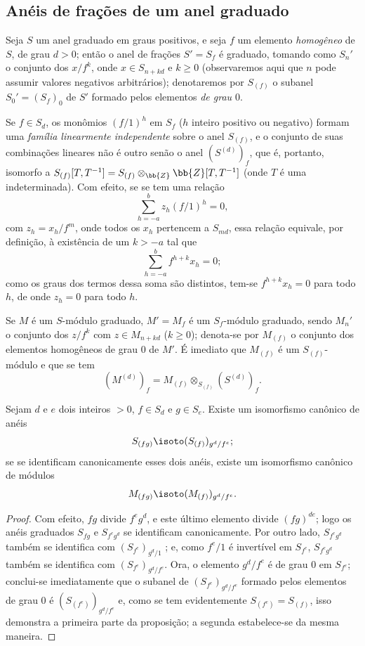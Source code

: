 \documentclass[oneside,10pt]{amsart}
\renewcommand{\geq}{\geqslant}
\newcommand{\oldpage}[2][]{\marginnote{\normalfont\footnotesize\textbf{#1}~|~#2}\ignorespaces}
\let\EGAOriginalLabel\label
\renewcommand{\label}[1]{\phantomsection\EGAOriginalLabel{#1}}
\begin{document}
\subsection{Anéis de frações de um anel graduado}
\label{subsection:II.2.2}

\begin{env}[2.2.1]
\label{II.2.2.1}
Seja $S$ um anel graduado em graus positivos, e seja $f$ um elemento \emph{homogêneo} de $S$, de grau $d>0$; então o anel de frações $S'=S_f$ é graduado, tomando como $S_n'$ o conjunto dos $x/f^k$, onde $x\in S_{n+kd}$ e $k\geq0$ (observaremos aqui que $n$ pode assumir valores negativos arbitrários); denotaremos por $S_{(f)}$ o subanel $S_0'=(S_f)_0$ de $S'$ formado pelos elementos \emph{de grau $0$}.

Se $f\in S_d$, os monômios $(f/1)^h$ em $S_f$ ($h$ inteiro positivo ou negativo) formam uma \emph{família linearmente independente} sobre o anel $S_{(f)}$, e o conjunto de suas combinações lineares não é outro senão
\oldpage[II]{24}
o anel $(S^{(d)})_f$, que é, portanto, isomorfo a $S_{(f)}[T,T^{-1}]=S_{(f)}\otimes_\bb{Z}\bb{Z}[T,T^{-1}]$ (onde $T$ é uma indeterminada).
Com efeito, se se tem uma relação
\[
  \sum_{h=-a}^{b}z_h(f/1)^h=0,
\]
com $z_h=x_h/f^m$, onde todos os $x_h$ pertencem a $S_{md}$, essa relação equivale, por definição, à existência de um $k>-a$ tal que
\[
  \sum_{h=-a}^{b}f^{h+k}x_h=0;
\]
como os graus dos termos dessa soma são distintos, tem-se $f^{h+k}x_h=0$ para todo $h$, de onde $z_h=0$ para todo $h$.

Se $M$ é um $S$-módulo graduado, $M'=M_f$ é um $S_f$-módulo graduado, sendo $M_n'$ o conjunto dos $z/f^k$ com $z\in M_{n+kd}$ ($k\geq0$); denota-se por $M_{(f)}$ o conjunto dos elementos homogêneos de grau $0$ de $M'$.
É imediato que $M_{(f)}$ é um $S_{(f)}$-módulo e que se tem
\[
  (M^{(d)})_f=M_{(f)}\otimes_{S_{(f)}}(S^{(d)})_f.
\]
\end{env}

\begin{lemma}[2.2.2]
\label{II.2.2.2}
Sejam $d$ e $e$ dois inteiros $>0$, $f\in S_d$ e $g\in S_e$.
Existe um isomorfismo canônico de anéis
\[
  S_{(fg)}\isoto(S_{(f)})_{g^d/f^e};
\]
se se identificam canonicamente esses dois anéis, existe um isomorfismo canônico de módulos
\[
  M_{(fg)}\isoto(M_{(f)})_{g^d/f^e}.
\]
\end{lemma}

\begin{proof}
Com efeito, $fg$ divide $f^eg^d$, e este último elemento divide $(fg)^{de}$; logo os anéis graduados $S_{fg}$ e $S_{f^eg^d}$ se identificam canonicamente.
Por outro lado, $S_{f^eg^d}$ também se identifica com $(S_{f^e})_{g^d/1}$ ; e, como $f^e/1$ é invertível em $S_{f^e}$, $S_{f^eg^d}$ também se identifica com $(S_{f^e})_{g^d/f^e}$.
Ora, o elemento $g^d/f^e$ é de grau $0$ em $S_{f^e}$; conclui-se imediatamente que o subanel de $(S_{f^e})_{g^d/f^e}$ formado pelos elementos de grau $0$ é $(S_{(f^e)})_{g^d/f^e}$ e, como se tem evidentemente $S_{(f^e)}=S_{(f)}$, isso demonstra a primeira parte da proposição; a segunda estabelece-se da mesma maneira.
\end{proof}
\end{document}
